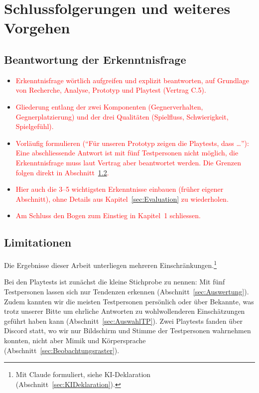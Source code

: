 \documentclass[../Main.tex]{subfiles}
\begin{document}
\section{Schlussfolgerungen und weiteres Vorgehen} \label{sec:Schlussfolgerungen}

\subsection{Beantwortung der Erkenntnisfrage} \label{sec:Beantwortung}

\begin{itemize}[leftmargin=1.5cm]
    \item \textcolor{red}{Erkenntnisfrage wörtlich aufgreifen und explizit beantworten, auf Grundlage von Recherche, Analyse, Prototyp und Playtest (Vertrag C.5).}
    \item \textcolor{red}{Gliederung entlang der zwei Komponenten (Gegnerverhalten, Gegnerplatzierung) und der drei Qualitäten (Spielfluss, Schwierigkeit, Spielgefühl).}
    \item \textcolor{red}{Vorläufig formulieren (\enquote{Für unseren Prototyp zeigen die Playtests, dass \ldots}): Eine abschliessende Antwort ist mit fünf Testpersonen nicht möglich, die Erkenntnisfrage muss laut Vertrag aber beantwortet werden. Die Grenzen folgen direkt in Abschnitt~\ref{sec:Limitationen}.}
    \item \textcolor{red}{Hier auch die 3--5 wichtigsten Erkenntnisse einbauen (früher eigener Abschnitt), ohne Details aus Kapitel~\ref{sec:Evaluation} zu wiederholen.}
    \item \textcolor{red}{Am Schluss den Bogen zum Einstieg in Kapitel~1 schliessen.}
\end{itemize}

\subsection{Limitationen} \label{sec:Limitationen}

Die Ergebnisse dieser Arbeit unterliegen mehreren Einschränkungen.\footnote{Mit Claude formuliert, siehe KI-Deklaration (Abschnitt~\ref{sec:KIDeklaration}).}

Bei den Playtests ist zunächst die kleine Stichprobe zu nennen: Mit fünf Testpersonen lassen sich nur Tendenzen erkennen (Abschnitt~\ref{sec:Auswertung}). Zudem kannten wir die meisten Testpersonen persönlich oder über Bekannte, was trotz unserer Bitte um ehrliche Antworten zu wohlwollenderen Einschätzungen geführt haben kann (Abschnitt~\ref{sec:AuswahlTP}). Zwei Playtests fanden über Discord statt, wo wir nur Bildschirm und Stimme der Testpersonen wahrnehmen konnten, nicht aber Mimik und Körpersprache (Abschnitt~\ref{sec:Beobachtungsraster}).
\end{document}

